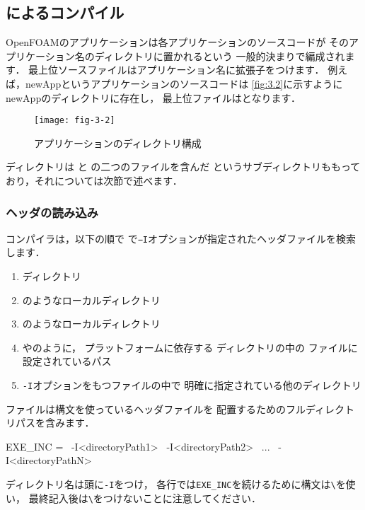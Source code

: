 \subsection{によるコンパイル}
\label{ssec:3.2.2}
OpenFOAMのアプリケーションは各アプリケーションのソースコードが
そのアプリケーション名のディレクトリに置かれるという
一般的決まりで編成されます．
最上位ソースファイルはアプリケーション名に拡張子をつけます．
例えば，newAppというアプリケーションのソースコードは
\autoref{fig:3.2}に示すようにnewAppのディレクトリに存在し，
最上位ファイルはとなります．


\begin{figure}[ht]
 \texttt{[image: fig-3-2]}
 \caption{アプリケーションのディレクトリ構成}
 \label{fig:3.2}
\end{figure}


ディレクトリは
%
%
と
%
%
の二つのファイルを含んだ
%
%
というサブディレクトリももっており，それについては次節で述べます．

\subsubsection{ヘッダの読み込み}
\label{sssec:3.2.2.1}
コンパイラは，以下の順で
で\verb|−I|オプションが指定されたヘッダファイルを検索します．
\begin{enumerate}
 \item {}ディレクトリ
 \item {}のようなローカルディレクトリ
 \item {}のようなローカルディレクトリ
 \item {}やのように，
%
       プラットフォームに依存する
       ディレクトリの中の
       ファイルに設定されているパス
 \item \verb|-I|オプションをもつファイルの中で
       明確に指定されている他のディレクトリ
\end{enumerate}
ファイルは構文を使っているヘッダファイルを
配置するためのフルディレクトリパスを含みます．
\begin{OFverbatim}[file]
EXE_INC = \
    -I<directoryPath1> \
    -I<directoryPath2> \
    ...                \
    -I<directoryPathN>
\end{OFverbatim}
ディレクトリ名は頭に\verb|-I|をつけ，
各行では\verb|EXE_INC|を続けるために構文は\verb|\|を使い，
最終記入後は\verb|\|をつけないことに注意してください．

